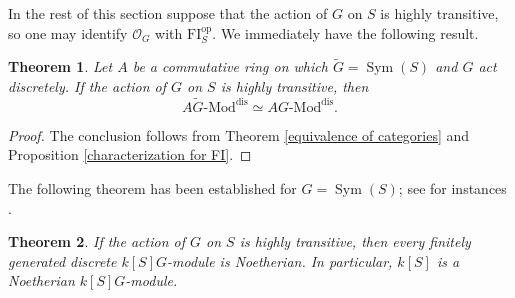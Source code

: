 \documentclass[11pt, reqno]{amsart}
\theoremstyle{plain}
\newtheorem{theorem}{Theorem}[section]
\numberwithin{equation}{section}
\theoremstyle{definition}
\newcommand{\Mod}{{\textrm{-}\mathrm{Mod}}}
\DeclareMathOperator{\Sym}{Sym}
\newcommand{\FI}{{\mathrm{FI}}}
\newcommand{\op}{{\mathrm{op}}}
\newcommand{\dis}{{\mathrm{dis}}}
\begin{document}
In the rest of this section suppose that the action of $G$ on $S$ is highly transitive, so one may identify $\mathcal{O}_G$ with $\FI_S^{\op}$. We immediately have the following result.

\begin{theorem} \label{main result 1'}
Let $A$ be a commutative ring on which $\tilde{G} = \Sym(S)$ and $G$ act discretely. If the action of $G$ on $S$ is highly transitive, then
\[
A \tilde{G} \Mod^{\dis} \simeq AG \Mod^{\dis}.
\]
\end{theorem}

\begin{proof}
The conclusion follows from Theorem \ref{equivalence of categories} and Proposition \ref{characterization for FI}.
\end{proof}

The following theorem has been established for $G = \Sym(S)$; see for instances \cite{AH, Co, HS}.

\begin{theorem} \label{Noetherian wrt permutation groups}
If the action of $G$ on $S$ is highly transitive, then every finitely generated discrete $k[S]G$-module is Noetherian. In particular, $k[S]$ is a Noetherian $k[S]G$-module.
\end{theorem}
\end{document}
